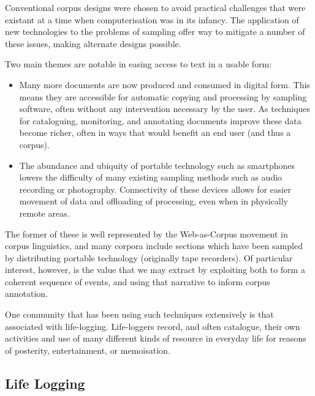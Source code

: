 Conventional corpus designs were chosen to avoid practical challenges that were existant at a time when computerisation was in its infancy.  The application of new technologies to the problems of sampling offer way to mitigate a number of these issues, making alternate designs possible.

Two main themes are notable in easing access to text in a usable form:

\begin{itemize}
    \item Many more documents are now produced and consumed in digital form.  This means they are accessible for automatic copying and processing by sampling software, often without any intervention necessary by the user.  As techniques for cataloguing, monitoring, and annotating documents improve these data become richer, often in ways that would benefit an end user (and thus a corpus).
    \item The abundance and ubiquity of portable technology such as smartphones lowers the difficulty of many existing sampling methods such as audio recording or photography.  Connectivity of these devices allows for easier movement of data and offloading of processing, even when in physically remote areas.
\end{itemize}


The former of these is well represented by the Web-as-Corpus movement in corpus linguistics, and many corpora include sections which have been sampled by distributing portable technology (originally tape recorders).  Of particular interest, however, is the value that we may extract by exploiting both to form a coherent sequence of events, and using that narrative to inform corpus annotation.

One community that has been using such techniques extensively is that associated with life-logging.  Life-loggers record, and often catalogue, their own activities and use of many different kinds of resource in everyday life for reasons of posterity, entertainment, or memoisation.










\subsection{Life Logging}

